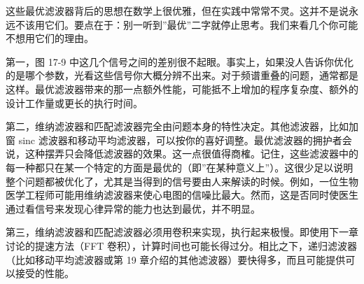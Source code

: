 这些最优滤波器背后的思想在数学上很优雅，但在实践中常常不灵。这并不是说永远不该用它们。要点在于：别一听到''最优''二字就停止思考。我们来看几个你可能不想用它们的理由。

第一，图 17-9
中这几个信号之间的差别很不起眼。事实上，如果没人告诉你优化的是哪个参数，光看这些信号你大概分辨不出来。对于频谱重叠的问题，通常都是这样。最优滤波器带来的那一点额外性能，可能抵不上增加的程序复杂度、额外的设计工作量或更长的执行时间。

第二，维纳滤波器和匹配滤波器完全由问题本身的特性决定。其他滤波器，比如加窗
sinc
滤波器和移动平均滤波器，可以按你的喜好调整。最优滤波器的拥护者会说，这种摆弄只会降低滤波器的效果。这一点很值得商榷。记住，这些滤波器中的每一种都只在某一个特定的方面是最优的（即''在某种意义上''）。这很少足以说明整个问题都被优化了，尤其是当得到的信号要由人来解读的时候。例如，一位生物医学工程师可能用维纳滤波器来使心电图的信噪比最大。然而，这是否同时使医生通过看信号来发现心律异常的能力也达到最优，并不明显。

第三，维纳滤波器和匹配滤波器必须用卷积来实现，执行起来极慢。即使用下一章讨论的提速方法（FFT
卷积），计算时间也可能长得过分。相比之下，递归滤波器（比如移动平均滤波器或第
19 章介绍的其他滤波器）要快得多，而且可能提供可以接受的性能。
